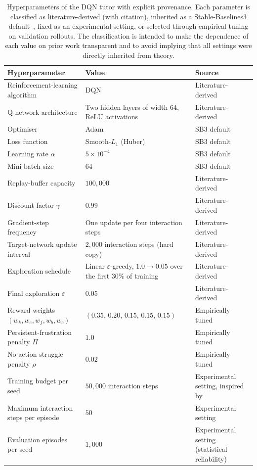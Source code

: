 \begin{table}[H]
\centering
\small
\caption{Hyperparameters of the \ac{DQN} tutor with explicit provenance. Each parameter is classified as literature-derived (with citation), inherited as a Stable-Baselines3 default~\cite{raffin_sb3_2021}, fixed as an experimental setting, or selected through empirical tuning on validation rollouts. The classification is intended to make the dependence of each value on prior work transparent and to avoid implying that all settings were directly inherited from theory.}
\label{tab:dqn_hparams}
\begin{tabular}{>{\raggedright\arraybackslash}p{5.2cm}
                >{\raggedright\arraybackslash}p{4.6cm}
                >{\raggedright\arraybackslash}p{4.6cm}}
\toprule
\textbf{Hyperparameter} & \textbf{Value} & \textbf{Source} \\
\midrule
Reinforcement-learning algorithm & \ac{DQN} & Literature-derived~\cite{mnih_dqn_2015,raffin_sb3_2021} \\
Q-network architecture & Two hidden layers of width $64$, ReLU activations & Literature-derived~\cite{nandimandalam_ai-powered_2025} \\
Optimiser & Adam & SB3 default~\cite{raffin_sb3_2021} \\
Loss function & Smooth-$L_1$ (Huber) & SB3 default~\cite{raffin_sb3_2021} \\
Learning rate $\alpha$ & $5 \times 10^{-4}$ & SB3 default~\cite{raffin_sb3_2021} \\
Mini-batch size & $64$ & SB3 default~\cite{raffin_sb3_2021} \\
Replay-buffer capacity & $100{,}000$ & Literature-derived~\cite{mnih_dqn_2015,raffin_sb3_2021} \\
Discount factor $\gamma$ & $0.99$ & Literature-derived~\cite{mnih_dqn_2015} \\
Gradient-step frequency & One update per four interaction steps & Literature-derived~\cite{mnih_dqn_2015,raffin_sb3_2021} \\
Target-network update interval & $2{,}000$ interaction steps (hard copy) & Literature-derived~\cite{mnih_dqn_2015} \\
Exploration schedule & Linear $\varepsilon$-greedy, $1.0 \to 0.05$ over the first $30\%$ of training & Literature-derived~\cite{mnih_dqn_2015} \\
Final exploration $\varepsilon$ & $0.05$ & Literature-derived~\cite{mnih_dqn_2015} \\
Reward weights $(w_k, w_e, w_f, w_b, w_c)$ & $(0.35,\, 0.20,\, 0.15,\, 0.15,\, 0.15)$ & Empirically tuned \\
Persistent-frustration penalty $\Pi$ & $1.0$ & Empirically tuned \\
No-action struggle penalty $\rho$ & $0.02$ & Empirically tuned \\
Training budget per seed & $50{,}000$ interaction steps & Experimental setting, inspired by~\cite{axak_adaptive_2025} \\
Maximum interaction steps per episode & $50$ & Experimental setting \\
Evaluation episodes per seed & $1{,}000$ & Experimental setting (statistical reliability) \\


\end{tabular}
\end{table}
